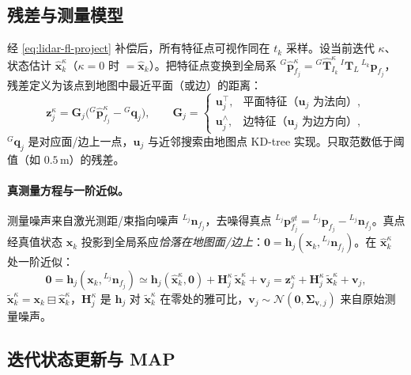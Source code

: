 \subsection{残差与测量模型}
\label{sec:lidar-fl-meas}

经 \cref{eq:lidar-fl-project} 补偿后，所有特征点可视作同在 $t_k$ 采样。设当前迭代 $\kappa$、状态估计 $\hat{\mathbf{x}}^\kappa_k$（$\kappa=0$ 时 $=\hat{\mathbf{x}}_k$）。把特征点变换到全局系 ${}^G\hat{\mathbf{p}}^\kappa_{f_j}={}^G\hat{\mathbf{T}}^\kappa_{I_k}\,{}^I\mathbf{T}_L\,{}^{L_k}\mathbf{p}_{f_j}$，残差定义为该点到地图中最近平面（或边）的距离\cite{xu2021fastlio}：
\begin{equation}
  \mathbf{z}^\kappa_j=\mathbf{G}_j\big({}^G\hat{\mathbf{p}}^\kappa_{f_j}-{}^G\mathbf{q}_j\big),\qquad
  \mathbf{G}_j=\begin{cases}\mathbf{u}_j^\top, & \text{平面特征（$\mathbf{u}_j$ 为法向）},\\ \mathbf{u}_j^\wedge, & \text{边特征（$\mathbf{u}_j$ 为边方向）},\end{cases}
  \label{eq:lidar-fl-residual}
\end{equation}
${}^G\mathbf{q}_j$ 是对应面/边上一点，$\mathbf{u}_j$ 与近邻搜索由地图点 KD-tree 实现。只取范数低于阈值（如 $0.5$\,m）的残差。

\paragraph{真测量方程与一阶近似。}
测量噪声来自激光测距/束指向噪声 ${}^{L_j}\mathbf{n}_{f_j}$，去噪得真点 ${}^{L_j}\mathbf{p}^{gt}_{f_j}={}^{L_j}\mathbf{p}_{f_j}-{}^{L_j}\mathbf{n}_{f_j}$。真点经真值状态 $\mathbf{x}_k$ 投影到全局系应\emph{恰落在地图面/边上}：$\mathbf{0}=\mathbf{h}_j(\mathbf{x}_k,{}^{L_j}\mathbf{n}_{f_j})$。在 $\hat{\mathbf{x}}^\kappa_k$ 处一阶近似：
\begin{equation}
  \mathbf{0}=\mathbf{h}_j(\mathbf{x}_k,{}^{L_j}\mathbf{n}_{f_j})\simeq\mathbf{h}_j(\hat{\mathbf{x}}^\kappa_k,\mathbf{0})+\mathbf{H}^\kappa_j\,\tilde{\mathbf{x}}^\kappa_k+\mathbf{v}_j=\mathbf{z}^\kappa_j+\mathbf{H}^\kappa_j\,\tilde{\mathbf{x}}^\kappa_k+\mathbf{v}_j,
  \label{eq:lidar-fl-linmeas}
\end{equation}
$\tilde{\mathbf{x}}^\kappa_k=\mathbf{x}_k\boxminus\hat{\mathbf{x}}^\kappa_k$，$\mathbf{H}^\kappa_j$ 是 $\mathbf{h}_j$ 对 $\tilde{\mathbf{x}}^\kappa_k$ 在零处的雅可比，$\mathbf{v}_j\sim\mathcal{N}(\mathbf{0},\boldsymbol{\Sigma}_{\mathbf{v},j})$ 来自原始测量噪声。

\subsection{迭代状态更新与 MAP}
\label{sec:lidar-fl-update}

